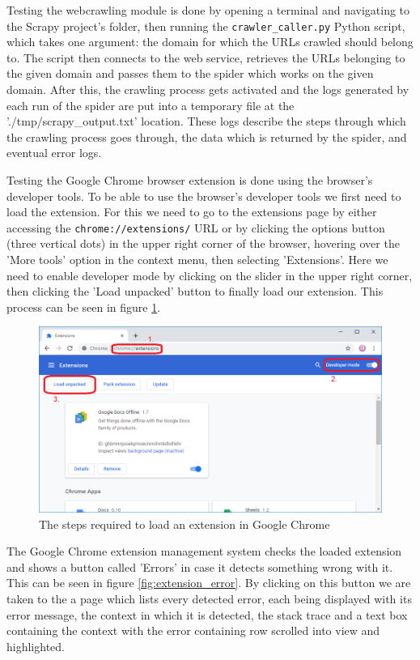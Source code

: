 \documentclass[12pt,a4paper,twoside]{report}
\begin{document}
Testing the webcrawling module is done by opening a terminal and navigating to the Scrapy project's folder, then running the \lstinline$crawler_caller.py$ Python script, which takes one argument: the domain for which the URLs crawled should belong to. The script then connects to the web service, retrieves the URLs belonging to the given domain and passes them to the spider which works on the given domain. After this, the crawling process gets activated and the logs generated by each run of the spider are put into a temporary file at the './tmp/scrapy\_output.txt' location. These logs describe the steps through which the crawling process goes through, the data which is returned by the spider, and eventual error logs.

Testing the Google Chrome browser extension is done using the browser's developer tools. To be able to use the browser's developer tools we first need to load the extension. For this we need to go to the extensions page by either accessing the \lstinline$chrome://extensions/$ URL or by clicking the options button (three vertical dots) in the upper right corner of the browser, hovering over the 'More tools' option in the context menu, then selecting 'Extensions'. Here we need to enable developer mode by clicking on the slider in the upper right corner, then clicking the 'Load unpacked' button to finally load our extension. This process can be seen in figure \ref{fig:loading_an_extension}.

\begin{figure}[ht]
  \centering
  \includegraphics[width=\linewidth]{img/loading_an_extension.png}
  \caption[]{The steps required to load an extension in Google Chrome}
  \label{fig:loading_an_extension}
\end{figure}

The Google Chrome extension management system checks the loaded extension and shows a button called 'Errors' in case it detects something wrong with it. This can be seen in figure \ref{fig:extension_error}. By clicking on this button we are taken to the a page which lists every detected error, each being displayed with its error message, the context in which it is detected, the stack trace and a text box containing the context with the error containing row scrolled into view and highlighted.
\end{document}
